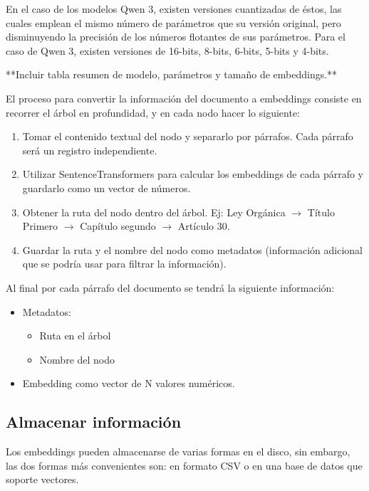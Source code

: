 En el caso de los modelos Qwen 3, existen versiones cuantizadas de éstos,
las cuales emplean el mismo número de parámetros que su versión original,
pero disminuyendo la precisión de los números flotantes de sus parámetros.
Para el caso de Qwen 3, existen versiones de 16-bits, 8-bits, 6-bits, 5-bits y
4-bits.

**Incluir tabla resumen de modelo, parámetros y tamaño de embeddings.**

El proceso para convertir la información del documento a embeddings consiste
en recorrer el árbol en profundidad, y en cada nodo hacer lo siguiente:

\begin{enumerate}
    \item Tomar el contenido textual del nodo y separarlo por párrafos.
          Cada párrafo será un registro independiente.
    \item Utilizar SentenceTransformers para calcular los embeddings de cada
          párrafo y guardarlo como un vector de números.
    \item Obtener la ruta del nodo dentro del árbol. Ej: Ley Orgánica $\rightarrow$
          Título Primero $\rightarrow$ Capítulo segundo $\rightarrow$ Artículo 30.
    \item Guardar la ruta y el nombre del nodo como metadatos (información
          adicional que se podría usar para filtrar la información).
\end{enumerate}

Al final por cada párrafo del documento se tendrá la siguiente información:

\begin{itemize}
    \item Metadatos:
          \begin{itemize}
              \item Ruta en el árbol
              \item Nombre del nodo
          \end{itemize}
    \item Embedding como vector de N valores numéricos.
\end{itemize}

\subsection{Almacenar información}

Los embeddings pueden almacenarse de varias formas en el disco, sin embargo,
las dos formas más convenientes son: en formato CSV o en una base de datos
que soporte vectores.


